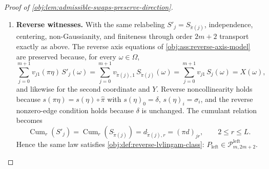 \begin{proof}[Proof of \cref{obj:lem:admissible-swaps-preserve-direction}]
\begin{enumerate}
The forward axis equations of \cref{obj:ass:forward-axis-model} are preserved with the swapped parameter: for every \(\omega\in\Omega\),
\[
\sum_{j=0}^{m+1}u_{j1}(\pi\theta)\,S'_j(\omega)
=\sum_{j=0}^{m+1}u_{\tilde\pi(j),1}\,S_{\tilde\pi(j)}(\omega)
=\sum_{j=0}^{m+1}u_{j1}\,S_j(\omega)
=X(\omega),
\]
and identically with the second loading coordinate and \(Y\); the middle equality is again bijective reindexing of a finite sum by \(\tilde\pi\).  Forward noncollinearity for \(\pi\theta\) is the injectivity statement already proved, and the nonzero-edge condition of \cref{obj:ass:forward-nonzero-edge} holds because the direct slope is still \(\gamma\).  Finally, for every \(j\) and every \(2\le r\le L\),
\[
\operatorname{Cum}_r(S'_j)=\operatorname{Cum}_r(S_{\tilde\pi(j)})=c_{\tilde\pi(j),r}=(\pi c)_{jr}.
\]
Thus \(\bigl(\Omega,\mu,(S'_j)_j,X,Y,\pi\theta\bigr)\) satisfies every clause of \cref{obj:def:forward-lvlingam-class} with the same observed pair, hence with the same pushforward law, and \(P_{\mathrm{right}}\in\mathcal P^{\mathrm{right}}_{m,2m+2}\).

\item \textbf{Reverse witnesses.}  With the same relabeling \(S'_j=S_{\tilde\pi(j)}\), independence, centering, non-Gaussianity, and finiteness through order \(2m+2\) transport exactly as above.  The reverse axis equations of \cref{obj:ass:reverse-axis-model} are preserved because, for every \(\omega\in\Omega\),
\[
\sum_{j=0}^{m+1}v_{j1}(\pi\eta)\,S'_j(\omega)
=\sum_{j=0}^{m+1}v_{\tilde\pi(j),1}\,S_{\tilde\pi(j)}(\omega)
=\sum_{j=0}^{m+1}v_{j1}\,S_j(\omega)=X(\omega),
\]
and likewise for the second coordinate and \(Y\).  Reverse noncollinearity holds because \(s(\pi\eta)=s(\eta)\circ\hat\pi\) with \(s(\eta)_0=\delta\), \(s(\eta)_i=\sigma_i\), and the reverse nonzero-edge condition holds because \(\delta\) is unchanged.  The cumulant relation becomes
\[
\operatorname{Cum}_r(S'_j)=\operatorname{Cum}_r(S_{\tilde\pi(j)})=d_{\tilde\pi(j),r}=(\pi d)_{jr},
\qquad 2\le r\le L .
\]
Hence the same law satisfies \cref{obj:def:reverse-lvlingam-class}: \(P_{\mathrm{left}}\in\mathcal P^{\mathrm{left}}_{m,2m+2}\).


\end{enumerate}
\end{proof}
